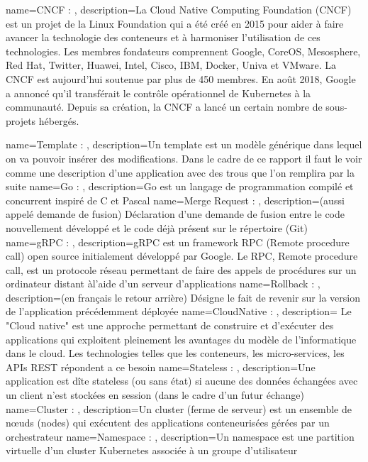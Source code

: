 {
    name=CNCF : ,
    description={La Cloud Native Computing Foundation (CNCF) est un projet de la Linux Foundation qui a été créé en 2015 pour aider à faire avancer la technologie des conteneurs  et à harmoniser l'utilisation de ces technologies.  Les membres fondateurs comprennent Google, CoreOS, Mesosphere, Red Hat, Twitter, Huawei, Intel, Cisco, IBM, Docker, Univa et VMware. La CNCF est aujourd'hui soutenue par plus de 450 membres. En août 2018, Google a annoncé qu'il transférait le contrôle opérationnel de Kubernetes à la communauté. Depuis sa création, la CNCF a lancé un certain nombre de sous-projets hébergés.}

}
{
    name=Template : ,
    description={Un template est un modèle générique dans lequel on va pouvoir insérer des modifications. Dans le cadre de ce rapport il faut le voir comme une description d'une application avec des trous que l'on remplira par la suite}
}
{
    name=Go : ,
    description={Go est un langage de programmation compilé et concurrent inspiré de C et Pascal}
}
{
    name=Merge Request : ,
    description={(aussi appelé demande de fusion) Déclaration d'une demande de fusion entre le code nouvellement développé et le code déjà présent sur le répertoire (Git)}
}
{
    name=gRPC : ,
    description={gRPC est un framework RPC (Remote procedure call) open source initialement développé par Google. Le RPC, Remote procedure call, est un protocole réseau permettant de faire des appels de procédures sur un ordinateur distant àl’aide d’un serveur d’applications}
}
{
    name=Rollback : ,
    description={(en français le retour arrière) Désigne le fait de revenir sur la version de l'application précédemment déployée}
}
{
    name=CloudNative : ,
    description={ Le "Cloud native" est une approche permettant de construire et d'exécuter des applications qui exploitent pleinement les avantages du modèle de l'informatique dans le cloud. Les technologies telles que les conteneurs, les micro-services, les APIs REST répondent a ce besoin}
}
{
    name=Stateless : ,
    description={Une application est dîte stateless (ou sans état) si aucune des données échangées avec un client n'est stockées en session (dans le cadre d'un futur échange)}
}
{
    name=Cluster : ,
    description={Un cluster  (ferme de serveur) est un ensemble de nœuds (nodes) qui exécutent des applications conteneurisées gérées par un orchestrateur}
}
{
    name=Namespace : ,
    description={Un namespace est une partition virtuelle d'un cluster Kubernetes associée à un groupe d'utilisateur}
}

